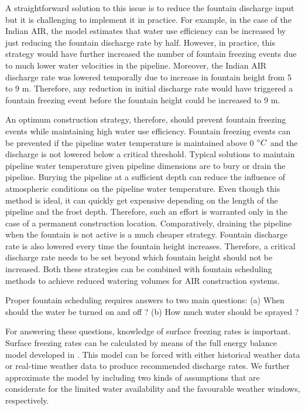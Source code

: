 \documentclass[tc, manuscript]{copernicus}
\begin{document}
A straightforward solution to this issue is to reduce the fountain discharge input but it is challenging to
implement it in practice. For example, in the case of the Indian AIR, the model estimates that water use
efficiency can be increased by just reducing the fountain discharge rate by half. However, in practice, this
strategy would have further increased the number of fountain freezing events due to much lower water velocities
in the pipeline. Moreover, the Indian AIR discharge rate was lowered temporally due to increase in fountain
height from 5 to 9 m. Therefore, any reduction in initial discharge rate would have triggered a fountain
freezing event before the fountain height could be increased to 9 m.

An optimum construction strategy, therefore, should prevent fountain freezing events while maintaining high
water use efficiency. Fountain freezing events can be prevented if the pipeline water temperature is maintained
above 0 $^{\circ} C$ and the discharge is not lowered below a critical threshold. Typical solutions to maintain
pipeline water temperature given pipeline dimensions are to bury or drain the pipeline. Burying the pipeline at
a sufficient depth can reduce the influence of atmospheric conditions on the pipeline water temperature. Even
though this method is ideal, it can quickly get expensive depending on the length of the pipeline and the frost
depth. Therefore, such an effort is warranted only in the case of a permanent construction location.
Comparatively, draining the pipeline when the fountain is not active is a much cheaper strategy. Fountain
discharge rate is also lowered every time the fountain height increases. Therefore, a critical discharge rate needs
to be set beyond which fountain height should not be increased. Both these strategies can be combined
with fountain scheduling methods to achieve reduced watering volumes for AIR construction systems. 

Proper fountain scheduling requires answers to two main questions: 
(a) When should the water be turned on and off ?
(b) How much water should be sprayed ? 

For answering these questions, knowledge of surface freezing rates is important. Surface freezing rates can be
calculated by means of the full energy balance model developed in
\cite{balasubramanianInfluenceMeteorologicalConditions2022}. This model can be forced with either historical
weather data or real-time weather data to produce recommended discharge rates. We further approximate the model
by including two kinds of assumptions that are considerate for the limited water availability and the favourable
weather windows, respectively.
\end{document}
